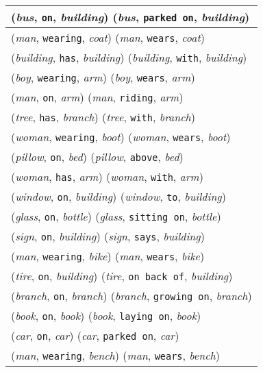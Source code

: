 \documentclass[runningheads]{llncs}
\begin{document}
{\begin{longtable}{ l }
(\textit{bus}, \texttt{on}, \textit{building})  (\textit{bus}, \texttt{parked on}, \textit{building}) \\ \hline
(\textit{man}, \texttt{wearing}, \textit{coat})  (\textit{man}, \texttt{wears}, \textit{coat}) \\ \hline
(\textit{building}, \texttt{has}, \textit{building})  (\textit{building}, \texttt{with}, \textit{building}) \\ \hline
(\textit{boy}, \texttt{wearing}, \textit{arm})  (\textit{boy}, \texttt{wears}, \textit{arm}) \\ \hline
(\textit{man}, \texttt{on}, \textit{arm})  (\textit{man}, \texttt{riding}, \textit{arm}) \\ \hline
(\textit{tree}, \texttt{has}, \textit{branch})  (\textit{tree}, \texttt{with}, \textit{branch}) \\ \hline
(\textit{woman}, \texttt{wearing}, \textit{boot})  (\textit{woman}, \texttt{wears}, \textit{boot}) \\ \hline
(\textit{pillow}, \texttt{on}, \textit{bed})  (\textit{pillow}, \texttt{above}, \textit{bed}) \\ \hline
(\textit{woman}, \texttt{has}, \textit{arm})  (\textit{woman}, \texttt{with}, \textit{arm}) \\ \hline
(\textit{window}, \texttt{on}, \textit{building})  (\textit{window}, \texttt{to}, \textit{building}) \\ \hline
(\textit{glass}, \texttt{on}, \textit{bottle})  (\textit{glass}, \texttt{sitting on}, \textit{bottle}) \\ \hline
(\textit{sign}, \texttt{on}, \textit{building})  (\textit{sign}, \texttt{says}, \textit{building}) \\ \hline
(\textit{man}, \texttt{wearing}, \textit{bike})  (\textit{man}, \texttt{wears}, \textit{bike}) \\ \hline
(\textit{tire}, \texttt{on}, \textit{building})  (\textit{tire}, \texttt{on back of}, \textit{building}) \\ \hline
(\textit{branch}, \texttt{on}, \textit{branch})  (\textit{branch}, \texttt{growing on}, \textit{branch}) \\ \hline
(\textit{book}, \texttt{on}, \textit{book})  (\textit{book}, \texttt{laying on}, \textit{book}) \\ \hline
(\textit{car}, \texttt{on}, \textit{car})  (\textit{car}, \texttt{parked on}, \textit{car}) \\ \hline
(\textit{man}, \texttt{wearing}, \textit{bench})  (\textit{man}, \texttt{wears}, \textit{bench}) \\ \hline

\end{longtable}}
\end{document}
